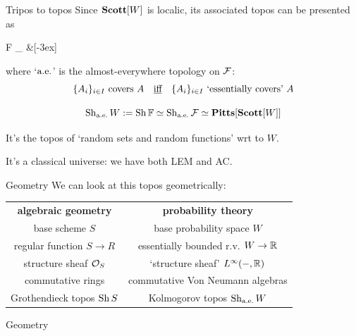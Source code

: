 \begin{frame}{Tripos to topos}
	Since $\mathbf{Scott}[W]$ is localic, its associated topos can be presented as
	\begin{diagram*}
		\Sh \alg F \equi \Sh_\aetop \F {} \&[-3ex] \Sh \F
	\end{diagram*}
	where `$\text{a.e.}$' is the almost-everywhere topology on $\mathcal{F}$:
	\begin{equation*}
		\text{$\{A_i\}_{i \in I}$ covers $A$}
		\quad\text{\underline{iff}}\quad
		\text{$\{A_i\}_{i \in I}$ `essentially covers' $A$}
	\end{equation*}

	\vfill
	\begin{definition}
		\begin{equation*}
			\operatorname{Sh}_{\text{a.e.}} W := \operatorname{Sh} \mathbb{F} \simeq \operatorname{Sh}_{\text{a.e.}} \mathcal{F} \simeq \mathbf{Pitts}[\mathbf{Scott}[W]]
		\end{equation*}
	\end{definition}

	\vfill
	It's the topos of `random sets and random functions' wrt to $W$.

	It's a classical universe: we have both LEM and AC.
\end{frame}


\begin{frame}{Geometry}
	We can look at this topos geometrically:

	\vfill
	\begin{center}
		\begin{tabularx}{\columnwidth}{C|c}
			\textbf{algebraic geometry} & \textbf{probability theory}\\[2ex]
			base scheme $S$ & base probability space $W$\\[2ex]
			regular function $S \to R$ & essentially bounded r.v. $W \to \mathbb{R}$\\[2ex]
			structure sheaf $\mathcal{O}_S$ & `structure sheaf' $L^\infty(-,\mathbb{R})$\\[2ex]
			commutative rings & commutative Von Neumann algebras\\[2ex]
			Grothendieck topos $\operatorname{Sh} S$ & {\color{colorgold}Kolmogorov topos} $\operatorname{Sh}_{\text{a.e.}} W$
		\end{tabularx}
	\end{center}
	\vfill
\end{frame}

{
	\begin{frame}{Geometry}
	\end{frame}
}

